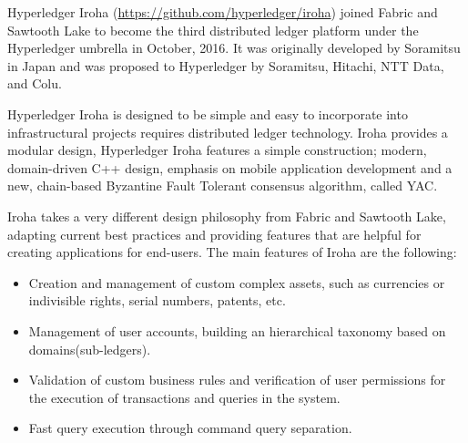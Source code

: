 Hyperledger Iroha (\url{https://github.com/hyperledger/iroha}) joined Fabric and Sawtooth Lake to become the third distributed ledger platform under the Hyperledger umbrella in October, 2016. It was originally developed by Soramitsu in Japan and was proposed to Hyperledger by Soramitsu, Hitachi, NTT Data, and Colu.

Hyperledger Iroha is designed to be simple and easy to incorporate into infrastructural projects requires distributed ledger technology. Iroha provides a modular design,  Hyperledger Iroha features a simple construction; modern, domain-driven C++ design, emphasis on mobile application development and a new, chain-based Byzantine Fault Tolerant consensus algorithm, called YAC.

 
Iroha takes a very different design philosophy from Fabric and Sawtooth Lake, adapting current best practices and providing features that are helpful for creating applications for end-users. The main features of Iroha are the following: 

\begin{itemize}
\item 
Creation and management of custom complex assets, such as currencies or indivisible rights, serial numbers, patents, etc.
\item Management of user accounts, building an hierarchical taxonomy based on domains(sub-ledgers).
\item Validation of custom business rules and verification of user permissions for the execution of transactions and queries in the system.
\item Fast query execution through command query separation. 
\end{itemize} 
